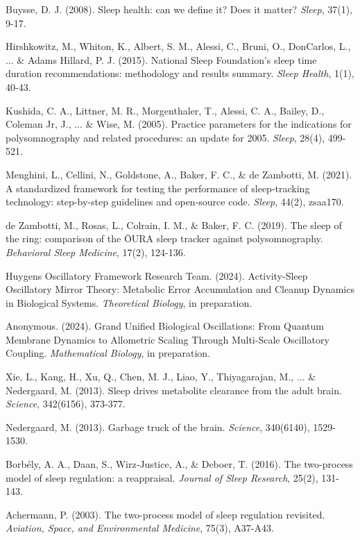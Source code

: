 \documentclass[twocolumn]{article}
\begin{document}
\begin{thebibliography}{99}

Buysse, D. J. (2008). Sleep health: can we define it? Does it matter? \textit{Sleep}, 37(1), 9-17.

Hirshkowitz, M., Whiton, K., Albert, S. M., Alessi, C., Bruni, O., DonCarlos, L., ... \& Adams Hillard, P. J. (2015). National Sleep Foundation's sleep time duration recommendations: methodology and results summary. \textit{Sleep Health}, 1(1), 40-43.

Kushida, C. A., Littner, M. R., Morgenthaler, T., Alessi, C. A., Bailey, D., Coleman Jr, J., ... \& Wise, M. (2005). Practice parameters for the indications for polysomnography and related procedures: an update for 2005. \textit{Sleep}, 28(4), 499-521.

Menghini, L., Cellini, N., Goldstone, A., Baker, F. C., \& de Zambotti, M. (2021). A standardized framework for testing the performance of sleep-tracking technology: step-by-step guidelines and open-source code. \textit{Sleep}, 44(2), zsaa170.

de Zambotti, M., Rosas, L., Colrain, I. M., \& Baker, F. C. (2019). The sleep of the ring: comparison of the ŌURA sleep tracker against polysomnography. \textit{Behavioral Sleep Medicine}, 17(2), 124-136.

Huygens Oscillatory Framework Research Team. (2024). Activity-Sleep Oscillatory Mirror Theory: Metabolic Error Accumulation and Cleanup Dynamics in Biological Systems. \textit{Theoretical Biology}, in preparation.

Anonymous. (2024). Grand Unified Biological Oscillations: From Quantum Membrane Dynamics to Allometric Scaling Through Multi-Scale Oscillatory Coupling. \textit{Mathematical Biology}, in preparation.

Xie, L., Kang, H., Xu, Q., Chen, M. J., Liao, Y., Thiyagarajan, M., ... \& Nedergaard, M. (2013). Sleep drives metabolite clearance from the adult brain. \textit{Science}, 342(6156), 373-377.

Nedergaard, M. (2013). Garbage truck of the brain. \textit{Science}, 340(6140), 1529-1530.

Borbély, A. A., Daan, S., Wirz‐Justice, A., \& Deboer, T. (2016). The two‐process model of sleep regulation: a reappraisal. \textit{Journal of Sleep Research}, 25(2), 131-143.

Achermann, P. (2003). The two-process model of sleep regulation revisited. \textit{Aviation, Space, and Environmental Medicine}, 75(3), A37-A43.

\end{thebibliography}
\end{document}
